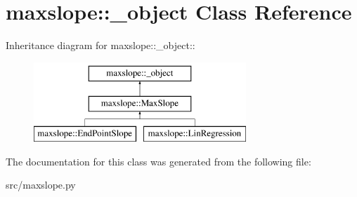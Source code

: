 \hypertarget{classmaxslope_1_1__object}{
\section{maxslope::\_\-object Class Reference}
\label{d1/d92/classmaxslope_1_1__object}
}
Inheritance diagram for maxslope::\_\-object::\begin{figure}[H]
\begin{center}
\leavevmode
\includegraphics[height=3cm]{d1/d92/classmaxslope_1_1__object}
\end{center}
\end{figure}


The documentation for this class was generated from the following file:\begin{DoxyCompactItemize}
\item 
src/maxslope.py\end{DoxyCompactItemize}
